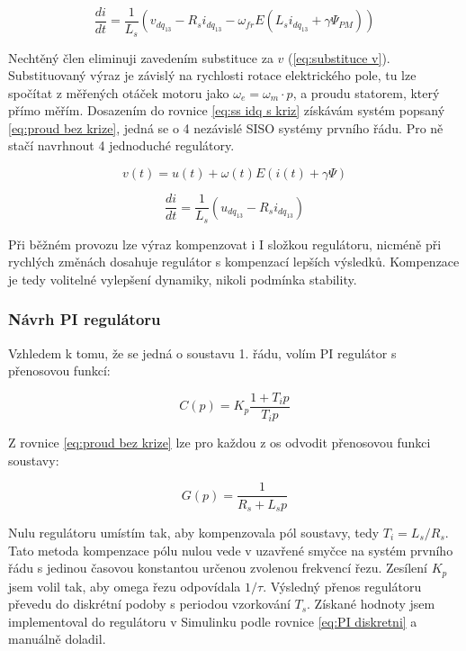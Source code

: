 \begin{equation}
    \label{eq:ss idq s kriz}
     \frac{di}{dt} = \frac{1}{L_s} \left( v_{dq_{13}} - R_s i_{dq_{13}} - \omega_{fr}E \left( L_{s}i_{dq_{13}} + \gamma \Psi_{PM}\right) \right)
\end{equation}



Nechtěný člen eliminuji zavedením substituce za $v$ (\ref{eq:substituce v}). Substituovaný výraz je závislý na rychlosti rotace elektrického pole, tu lze spočítat z měřených otáček motoru jako $\omega_e=\omega_m \cdot p $, a proudu statorem, který přímo měřím. Dosazením do rovnice \ref{eq:ss idq s kriz} získávám systém popsaný \ref{eq:proud bez krize}, jedná se o 4 nezávislé SISO systémy prvního řádu. Pro ně stačí navrhnout 4 jednoduché regulátory.  


\begin{equation}
\label{eq:substituce v}
    v(t)=u(t) +  \omega(t) E \left(  i(t) + \gamma \Psi\right)
\end{equation}

\begin{equation}
    \label{eq:proud bez krize}
     \frac{di}{dt} = \frac{1}{L_s} \left( u_{dq_{13}} - R_s i_{dq_{13}}  \right)
\end{equation}

Při běžném provozu lze výraz kompenzovat i I složkou regulátoru, nicméně při rychlých změnách dosahuje regulátor s kompenzací lepších výsledků. Kompenzace je tedy volitelné vylepšení dynamiky, nikoli podmínka stability.

\subsubsection{Návrh PI regulátoru}
Vzhledem k tomu, že se jedná o soustavu 1. řádu, volím PI regulátor s přenosovou funkcí:

\begin{equation}
    \label{eq:PI}
    C(p) = K_p \frac{1 + T_i p}{T_i p}
\end{equation}



Z rovnice \ref{eq:proud bez krize} lze pro každou z os odvodit přenosovou funkci soustavy:

\begin{equation}
    \label{eq:tf proud}
    G(p) = \frac{1}{R_s + L_s p}
\end{equation}

Nulu regulátoru umístím tak, aby kompenzovala pól soustavy, tedy $T_i = L_s / R_s$. Tato metoda kompenzace pólu nulou vede v uzavřené smyčce na systém prvního řádu s jedinou časovou konstantou určenou zvolenou frekvencí řezu. Zesílení $K_p$ jsem volil tak, aby omega řezu odpovídala ${1}/{\tau}$. Výsledný přenos regulátoru převedu do diskrétní podoby s periodou vzorkování $T_s$. Získané hodnoty jsem implementoval do regulátoru v Simulinku podle rovnice \ref{eq:PI diskretni} a manuálně doladil.

